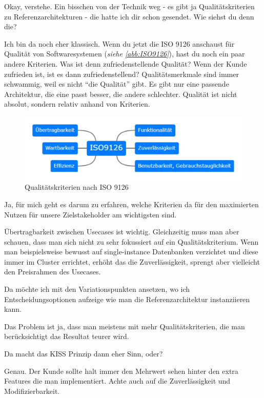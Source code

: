 \LF Okay, verstehe. Ein bisschen von der Technik weg - es gibt ja Qualitätskriterien zu Referenzarchitekturen - die hatte ich dir schon gesendet. Wie siehst du denn die?

\RB Ich bin da noch eher klassisch. Wenn du jetzt die ISO 9126 anschaust für Qualität von Softwaresystemen (\textit{siehe \autoref{abb:ISO9126}}), hast du noch ein paar andere Kriterien. Was ist denn zufriedenstellende Qualität? Wenn der Kunde zufrieden ist, ist es dann zufriedenstellend? Qualitätsmerkmale sind immer schwammig, weil es nicht \enquote{die Qualität} gibt. Es gibt nur eine passende Architektur, die eine passt besser, die andere schlechter. Qualität ist nicht absolut, sondern relativ anhand von Kriterien. 

\begin{figure}[H]
\centering
\includegraphics[width=\textwidth]{graphics/ISO-9126.pdf}
\caption[Qualitätskriterien nach ISO 9126]{Qualitätskriterien nach ISO 9126\footnotemark}
\label{abb:ISO9126}
\end{figure}

\LF Ja, für mich geht es darum zu erfahren, welche Kriterien da für den maximierten Nutzen für unsere Zielstakeholder am wichtigsten sind.

\RB Übertragbarkeit zwischen Usecases ist wichtig. Gleichzeitig muss man aber schauen, dass man sich nicht zu sehr fokussiert auf ein Qualitätskriterium. Wenn man beispielsweise bewusst auf single-instance Datenbanken verzichtet und diese immer im Cluster errichtet, erhöht das die Zuverlässigkeit, sprengt aber vielleicht den Preisrahmen des Usecases. 

\LF Da möchte ich mit den Variationspunkten ansetzen, wo ich Entscheidungsoptionen aufzeige wie man die Referenzarchitektur instanziieren kann.

\RB Das Problem ist ja, dass man meistens mit mehr Qualitätskriterien, die man berücksichtigt das Resultat teurer wird.

\LF Da macht das KISS Prinzip dann eher Sinn, oder?

\RB Genau. Der Kunde sollte halt immer den Mehrwert sehen hinter den extra Features die man implementiert. Achte auch auf die Zuverlässigkeit und Modifizierbarkeit. 

